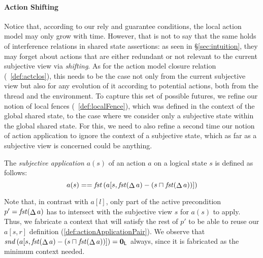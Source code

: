 \paragraph{Action Shifting}
Notice that, according to our rely and guarantee conditions, the local
action model may only grow with time. However, that is not to say that
the same holds of interference relations in shared state assertions:
as seen in \S\ref{sec:intuition}, they may forget about actions that
are either redundant or not relevant to the current subjective
view via \emph{shifting}. As for the action model closure relation
(~\ref{def:actclos}), this needs to be the case not only
from the current subjective view but also for any evolution of it
according to potential actions, both from the thread and the
environment. To capture this set of possible futures, we refine our
notion of local fences (~\ref{def:localFence}), which was
defined in the context of the global shared state, to the case where
we consider only a subjective state within the global shared state.
For this, we need to also refine a second time our notion of action
application to ignore the context of a subjective state, which as far
as a subjective view is concerned could be anything.


\begin{definition}
  The \emph{subjective application} $a(s)$ of an action $a$ on a
  logical state $s$ is defined as follows:
  \[
  a(s) == \mathit{fst} \left( a[s, \mathit{fst}(\mathop{\Delta} a) - (s\sqcap_{} \mathit{fst}(\mathop{\Delta} a))] \right)
  \]
\end{definition}

Note that, in contrast with $a[l]$, only part of the active
precondition $p' = \mathit{fst}(\mathop{\Delta} a)$ has to intersect with the
subjective view $s$ for $a(s)$ to apply. Thus, we fabricate a context
that will satisfy the rest of $p'$ to be able to reuse our $a[s,r]$
definition (\ref{def:actionApplicationPair}). We observe that $\mathit{snd} \left( a[s, \mathit{fst}(\mathop{\Delta} a) - (s\sqcap_{} \mathit{fst}(\mathop{\Delta} a))] \right) = \mathbf{0}_{\textsf{L}}$ always, since it is fabricated as the minimum context needed. 

